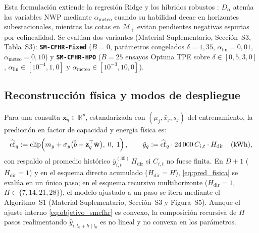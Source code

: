 Esta formulación extiende la regresión Ridge \cite{hoerl1970} y los híbridos robustos \cite{owen2007}: $D_\alpha$ atenúa las variables NWP mediante $\alpha_{\mathrm{meteo}}$ cuando su habilidad decae en horizontes subestacionales, mientras las cotas en $\mathcal{M}_+$ evitan pendientes negativas espurias por colinealidad. Se evalúan dos variantes (Material Suplementario, Sección~S3, Tabla~S3): \textbf{\texttt{SM-CFHR-Fixed}} ($B=0$, parámetros congelados $\delta=1{,}35$, $\alpha_{\mathrm{lin}}=0{,}01$, $\alpha_{\mathrm{meteo}}=0{,}10$) y \textbf{\texttt{SM-CFHR-HPO}} ($B=25$ ensayos Optuna TPE sobre $\delta \in [0{,}5, 3{,}0]$, $\alpha_{\mathrm{lin}} \in [10^{-4}, 1{,}0]$ y $\alpha_{\mathrm{meteo}} \in [10^{-3}, 10{,}0]$).

\subsection{Reconstrucción física y modos de despliegue}

Para una consulta $\mathbf{x}_q \in \mathbb{R}^p$, estandarizada con $(\mu_j, \bar{x}_j, \tilde{s}_j)$ del entrenamiento, la predicción en factor de capacidad y energía física es:
\begin{equation}
\widehat{\mathrm{cf}}_q := \operatorname{clip}\!\left(m_y + \sigma_y \big(\hat{b} + \mathbf{z}_q^\top \hat{\mathbf{w}}\big),\; 0,\; 1\right),
\qquad
\hat{y}_q := \widehat{\mathrm{cf}}_q \cdot 24\,000\,C_{i,t} \cdot H_{\mathrm{dir}} \quad (\text{kWh}),
\label{eq:pred_fisica}
\end{equation}
con respaldo al promedio histórico $\bar{y}^{(30)}_{i,t}\,H_{\mathrm{dir}}$ si $C_{i,t}$ no fuese finita. En $D+1$ ($H_{\mathrm{dir}}=1$) y en el esquema directo acumulado ($H_{\mathrm{dir}}=H$), \eqref{eq:pred_fisica} se evalúa en un único paso; en el esquema recursivo multihorizonte ($H_{\mathrm{dir}}=1$, $H \in \{7,14,21,28\}$), el modelo ajustado a un paso se itera mediante el Algoritmo~S1 (Material Suplementario, Sección~S3 y Figura~S5). Aunque el ajuste interno \eqref{eq:objetivo_smcfhr} es convexo, la composición recursiva de $H$ pasos realimentando $\hat{y}_{i,t_0+h \mid t_0}$ es no lineal y no convexa en los parámetros.
